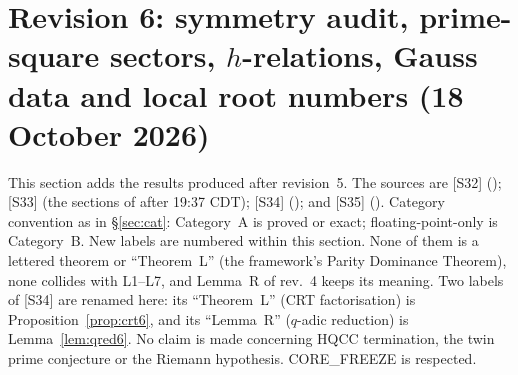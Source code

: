 \section{Revision 6: symmetry audit, prime-square sectors, $h$-relations, Gauss data and local root numbers (18 October 2026)}\label{sec:rev6}
This section adds the results produced after revision~5. The sources are [S32] (); [S33] (the sections of  after 19:37 CDT); [S34] (); and [S35] ().
Category convention as in \S\ref{sec:cat}: Category~A is proved or exact; floating-point-only is Category~B. New labels are numbered within this section. None of them is a lettered theorem or ``Theorem~L'' (the framework's Parity Dominance Theorem), none collides with L1--L7, and Lemma~R of rev.~4 keeps its meaning. Two labels of [S34] are renamed here: its ``Theorem~L'' (CRT factorisation) is Proposition~\ref{prop:crt6}, and its ``Lemma~R'' ($q$-adic reduction) is Lemma~\ref{lem:qred6}. No claim is made concerning HQCC termination, the twin prime conjecture or the Riemann hypothesis. CORE\_FREEZE is respected.

